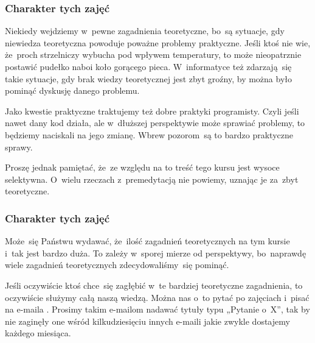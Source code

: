 \documentclass[10pt,t]{beamer}
\begin{document}
\begin{frame}
  \frametitle{Charakter tych zajęć}


  Niekiedy wejdziemy w~pewne zagadnienia teoretyczne, bo~są sytuacje, gdy
  niewiedza teoretyczna powoduje poważne problemy praktyczne. Jeśli ktoś
  nie wie, że~proch strzelniczy wybucha pod wpływem temperatury, to może
  nieopatrznie postawić pudełko naboi koło gorącego pieca. W~informatyce
  też zdarzają~się takie sytuacje, gdy brak wiedzy teoretycznej jest zbyt
  groźny, by można było pominąć dyskusję danego problemu.

  Jako kwestie praktyczne traktujemy też dobre praktyki programisty.
  Czyli jeśli nawet dany kod działa, ale w~dłuższej perspektywie może
  sprawiać problemy, to będziemy naciskali na jego zmianę. Wbrew
  pozorom~są to bardzo praktyczne sprawy.

  Proszę jednak pamiętać, że~ze względu na to treść tego kursu jest wysoce
  selektywna. O~wielu rzeczach z~premedytacją nie powiemy, uznając je
  za~zbyt teoretyczne.

\end{frame}





\begin{frame}
  \frametitle{Charakter tych zajęć}


  Może~się Państwu wydawać, że~ilość zagadnień teoretycznych na tym kursie
  i~tak jest bardzo duża. To zależy w~sporej mierze od perspektywy,
  bo~naprawdę wiele zagadnień teoretycznych zdecydowaliśmy~się pominąć.

  Jeśli oczywiście ktoś chce~się zagłębić w~te bardziej teoretyczne
  zagadnienia, to oczywiście służymy całą naszą wiedzą. Można
  nas o~to pytać po zajęciach i~pisać na e-maila \email.
  Prosimy takim e-mailom nadawać tytuły typu „Pytanie o~X”, tak by nie
  zaginęły one wśród kilkudziesięciu innych e-maili jakie zwykle dostajemy
  każdego miesiąca.

\end{frame}
\end{document}
